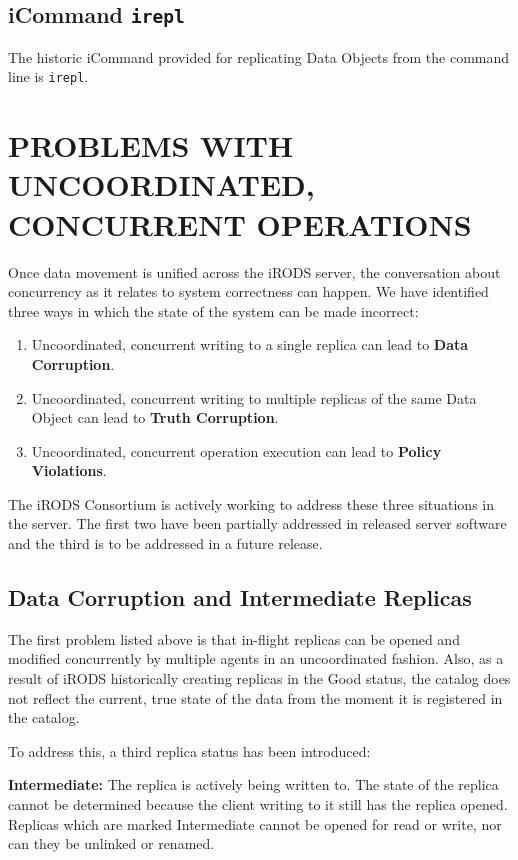 \documentclass{irodsugm}
\begin{document}
\subsection*{iCommand \texttt{irepl}}
The historic iCommand provided for replicating Data Objects from the command line is \texttt{irepl}. 

\section*{PROBLEMS WITH UNCOORDINATED, CONCURRENT OPERATIONS}

Once data movement is unified across the iRODS server, the conversation about concurrency as it relates to system correctness can happen. We have identified three ways in which the state of the system can be made incorrect:

\begin{enumerate}
\item Uncoordinated, concurrent writing to a single replica can lead to \textbf{Data Corruption}.
\item Uncoordinated, concurrent writing to multiple replicas of the same Data Object can lead to \textbf{Truth Corruption}.
\item Uncoordinated, concurrent operation execution can lead to \textbf{Policy Violations}.
\end{enumerate}

The iRODS Consortium is actively working to address these three situations in the server. The first two have been partially addressed in released server software and the third is to be addressed in a future release.

\subsection*{Data Corruption and Intermediate Replicas}

The first problem listed above is that in-flight replicas can be opened and modified concurrently by multiple agents in an uncoordinated fashion. Also, as a result of iRODS historically creating replicas in the Good status, the catalog does not reflect the current, true state of the data from the moment it is registered in the catalog.

To address this, a third replica status has been introduced:

\textbf{Intermediate:} The replica is actively being written to. The state of the replica cannot be determined because the client writing to it still has the replica opened. Replicas which are marked Intermediate cannot be opened for read or write, nor can they be unlinked or renamed.
\end{document}
